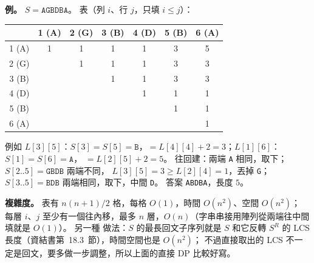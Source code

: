 \begin{pastsoln}
\textbf{例。} $S = \texttt{AGBDBA}$。 表（列 $i$、行 $j$，只填 $i \le j$）：
\begin{center}
\begin{tabular}{c|cccccc}
 & 1 (A) & 2 (G) & 3 (B) & 4 (D) & 5 (B) & 6 (A) \\
\hline
1 (A) & 1 & 1 & 1 & 1 & 3 & 5 \\
2 (G) & & 1 & 1 & 1 & 3 & 3 \\
3 (B) & & & 1 & 1 & 3 & 3 \\
4 (D) & & & & 1 & 1 & 1 \\
5 (B) & & & & & 1 & 1 \\
6 (A) & & & & & & 1 \\
\end{tabular}
\end{center}
例如 $L[3][5]$：$S[3] = S[5] = \texttt{B}$，$= L[4][4] + 2 = 3$；$L[1][6]$：$S[1] = S[6] = \texttt{A}$，
$= L[2][5] + 2 = 5$。 往回建：兩端 \texttt{A} 相同，取下；$S[2..5] = \texttt{GBDB}$ 兩端不同，
$L[3][5] = 3 \ge L[2][4] = 1$，丟掉 \texttt{G}；$S[3..5] = \texttt{BDB}$ 兩端相同，取下，中間 \texttt{D}。
答案 \texttt{ABDBA}，長度 $5$。

\textbf{複雜度。} 表有 $n(n+1)/2$ 格，每格 $O(1)$，時間 $O(n^2)$、空間 $O(n^2)$； 每層
$i$、$j$ 至少有一個往內移，最多 $n$ 層，$O(n)$（字串串接用陣列從兩端往中間填就是 $O(1)$）。 另一種
做法：$S$ 的最長回文子序列就是 $S$ 和它反轉 $S^R$ 的 LCS 長度（資結書第~18.3~節），時間空間也是 $O(n^2)$；
不過直接取出的 LCS 不一定是回文，要多做一步調整，所以上面的直接 DP 比較好寫。
\end{pastsoln}
